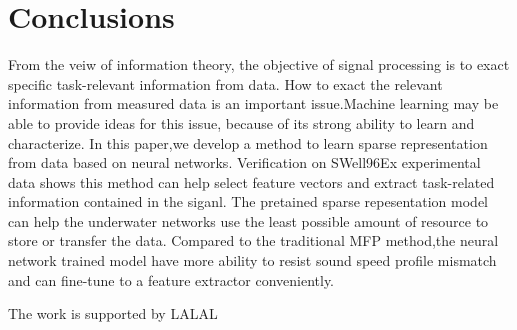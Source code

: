\section{Conclusions}
From the veiw of information theory, the objective of signal processing is to exact specific task-relevant information from data.
How to exact the relevant information from measured data is an important issue.Machine learning may be able to provide ideas for this issue, because of its strong ability to learn and characterize.
In this paper,we develop a method to learn sparse representation from data based on neural networks.
Verification on SWell96Ex experimental data shows this method can help select feature vectors and extract task-related information contained in the siganl. The pretained sparse repesentation model can help the underwater networks use the least possible amount of resource to store or transfer the data. Compared to the traditional MFP method,the neural network trained model have more ability to resist sound speed profile mismatch and can fine-tune to a feature extractor conveniently.

\begin{acks}
The work is supported by LALAL

\end{acks}
